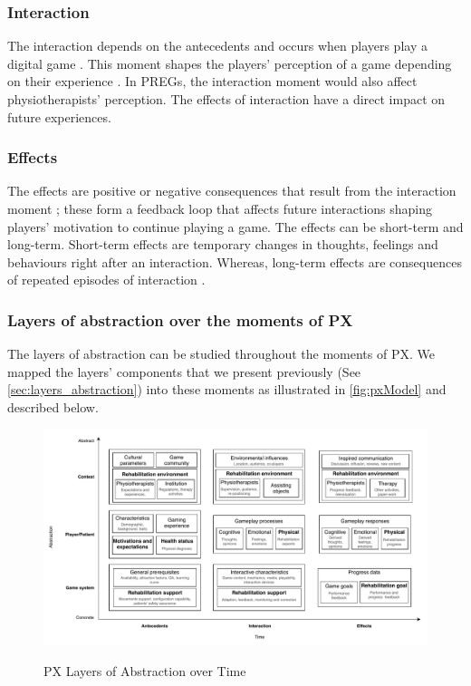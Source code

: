 \subsubsection*{Interaction}
The interaction depends on the antecedents and occurs when players play a digital game \autocite{Elson2014,Fernandez2008,Nacked}. This moment shapes the players' perception of a game depending on their experience \autocite{Fernandez2008}. In \acp{PREG}, the interaction moment would also affect physiotherapists' perception. The effects of interaction have a direct impact on future experiences.

\subsubsection*{Effects}
The effects are positive or negative consequences that result from the interaction moment \autocite{Fernandez2008}; these form a feedback loop that affects future interactions \autocite{Nacked,Elson2014} shaping players' motivation to continue playing a game. The effects can be short-term and long-term. Short-term effects are temporary changes in thoughts, feelings and behaviours right after an interaction. Whereas, long-term effects are consequences of repeated episodes of interaction \autocite{Elson2014}.

\subsubsection{Layers of abstraction over the moments of \ac{PX}}
\label{sec:rel_among_dimensions}
The layers of abstraction can be studied throughout the moments of \ac{PX}. We mapped the layers' components that we present previously (See \autoref{sec:layers_abstraction}) into these moments as illustrated in \autoref{fig:pxModel} and described below.

\begin{figure}[bth]
\myfloatalign
{\includegraphics[width=\linewidth]{gfx/model/pxModel}} \quad
\caption{\ac{PX} Layers of Abstraction over Time}\label{fig:pxModel}
\end{figure}

